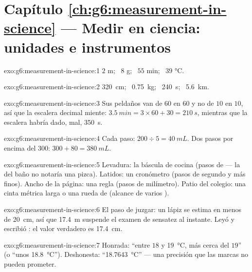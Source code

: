 \section*{Capítulo \ref{ch:g6:measurement-in-science} --- Medir en ciencia: unidades e instrumentos}

\begin{solution}{exo:g6:measurement-in-science:1}
$2$ \unit{m}; \ $8$ \unit{g}; \ $55$ \unit{min}; \ $39$
\unit{\celsius}.
\end{solution}

\begin{solution}{exo:g6:measurement-in-science:2}
\qty{320}{cm}; \ \qty{0.75}{kg}; \ \qty{240}{s}; \ \qty{5.6}{km}.
\end{solution}

\begin{solution}{exo:g6:measurement-in-science:3}
Sus peldaños van de $60$ en $60$ y no de $10$ en $10$, así que la
escalera decimal miente:
$\qty{3.5}{min} = 3 \times 60 + 30 = \qty{210}{s}$, mientras que la
escalera habría dado, mal, \qty{350}{s}.
\end{solution}

\begin{solution}{exo:g6:measurement-in-science:4}
Cada paso: $200 \div 5 = \qty{40}{mL}$. Dos pasos por encima del
$300$: $300 + 80 = \qty{380}{mL}$.
\end{solution}

\begin{solution}{exo:g6:measurement-in-science:5}
Levadura: la báscula de cocina (pasos de  --- la del baño no
notaría una pizca). Latidos: un cronómetro (pasos de segundo y más
finos). Ancho de la página: una regla (pasos de milímetro). Patio del
colegio: una cinta métrica larga o una rueda de  (alcance de
varios ).
\end{solution}

\begin{solution}{exo:g6:measurement-in-science:6}
El paso de juzgar: un lápiz se estima en menos de \qty{20}{cm}, así
que \qty{17.4}{m} suspende el examen de sensatez al instante. Leyó
 y escribió : el valor verdadero es
\qty{17.4}{cm}.
\end{solution}

\begin{solution}{exo:g6:measurement-in-science:7}
Honrada: ``entre $18$ y \qty{19}{\celsius}, más cerca del $19$'' (o
``unos \qty{18.8}{\celsius}''). Deshonesta:
``\qty{18.7643}{\celsius}'' --- una precisión que las marcas no pueden
prometer.
\end{solution}

